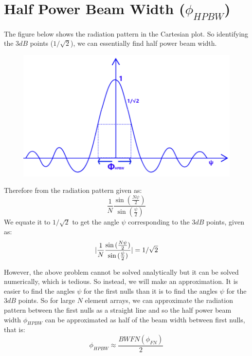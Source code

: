 \chapter{Half Power Beam Width ($\phi_{HPBW}$)}
The figure below shows the radiation pattern in the Cartesian plot. So identifying the $3dB$ points ($1/\sqrt{2}$), we can essentially find half power beam width.
\begin{figure}[h]
\centering
\includegraphics[width=1\linewidth]{./graphics/fig54_1}
\caption{}
\label{54.1}
\end{figure}

Therefore from the radiation pattern given as:
$$
\frac{1}{N} \frac{\sin{(\frac{N \psi}{2})}}{\sin{(\frac{ \psi}{2})}}
$$
We equate it to $1/\sqrt{2}$ to get the angle $\psi$ corresponding to the $3dB$ points, given as:
\begin{equation}
\arrowvert \frac{1}{N} \frac{\sin{(\frac{N \psi}{2})}}{\sin{(\frac{ \psi}{2})}} \arrowvert = 1/\sqrt{2}
\end{equation}

However, the above problem cannot be solved analytically but it can be solved numerically, which is tedious. So instead, we will make an approximation. It is easier to find the angles $\psi$ for the first nulls than it is to find the angles $\psi$ for the $3dB$ points. So for large $N$ element arrays, we can approximate the radiation pattern between the first nulls as a straight line and so the half power beam width $\phi_{HPBW}$ can be approximated as half of the beam width between first nulls, that is:
\begin{equation}
\phi_{HPBW} \approx \frac{BWFN (\phi_{FN})}{2}
\end{equation}

